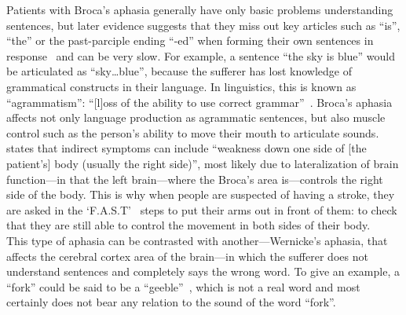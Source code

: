\documentclass[12pt]{article}
\begin{document}
Patients with Broca's aphasia generally have only basic problems
understanding sentences, but later evidence suggests that they miss
out key articles such as ``is'', ``the'' or the past-parciple ending
``-ed'' when forming their own sentences in
response~\citep{articles-omitted-primary} and can be very slow. For
example, a sentence ``the sky is blue'' would be articulated as
``sky\ldots blue'', because the sufferer has lost knowledge of
grammatical constructs in their language. In linguistics, this is
known as ``agrammatism'': ``[l]oss of the ability to use correct
grammar''~\cite{oed-agrammatism}. Broca's aphasia affects not only
language production as agrammatic sentences, but also muscle control
such as the person's ability to move their mouth to articulate
sounds. \citeauthor{nhs-choices-brocas-aphasia} states that indirect
symptoms can include ``weakness down one side of [the patient's]
body (usually the right side)'', most likely due to lateralization of
brain function---in that the left brain---where the Broca's area
is---controls the right side of the body. This is why when people are
suspected of having a stroke, they are asked in the
`F.A.S.T'~\cite{stroke-fast-phe,stroke-fast-nhs} steps to put their arms
out in front of them: to check that they are still able to control the
movement in both sides of their body.\\

This type of aphasia can be contrasted with another---Wernicke's
aphasia, that affects the cerebral cortex area of the brain---in which
the sufferer does not understand sentences and completely says the
wrong word. To give an example, a ``fork'' could be said to be a
``geeble''~\cite{fork-geeble}, which is not a real word and most
certainly does not bear any relation to the sound of the word
``fork''.\\
\end{document}
